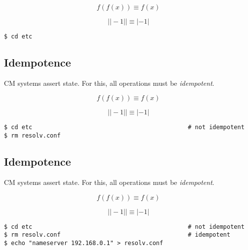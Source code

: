 \documentclass[xga]{xdvislides}
\begin{document}
\begin{displaymath}
f(f(x)) \equiv f(x)
\end{displaymath}

\begin{displaymath}
| |-1| | \equiv |-1|
\end{displaymath}

\begin{verbatim}
$ cd etc
\end{verbatim}

\subsection{Idempotence}
CM systems assert state.  For this, all operations
must be {\em idempotent}. \\
\vspace{.5in}

\begin{displaymath}
f(f(x)) \equiv f(x)
\end{displaymath}

\begin{displaymath}
| |-1| | \equiv |-1|
\end{displaymath}

\begin{verbatim}
$ cd etc                                            # not idempotent
$ rm resolv.conf
\end{verbatim}

\subsection{Idempotence}
CM systems assert state.  For this, all operations
must be {\em idempotent}. \\
\vspace{.5in}

\begin{displaymath}
f(f(x)) \equiv f(x)
\end{displaymath}

\begin{displaymath}
| |-1| | \equiv |-1|
\end{displaymath}

\begin{verbatim}
$ cd etc                                            # not idempotent
$ rm resolv.conf                                    # idempotent
$ echo "nameserver 192.168.0.1" > resolv.conf
\end{verbatim}
\end{document}
